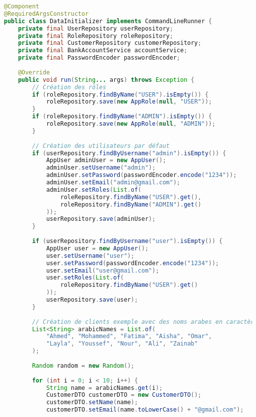 \documentclass[12pt,a4paper]{report}
\begin{document}
\begin{lstlisting}[language=Java, caption=DataInitializer.java]
@Component
@RequiredArgsConstructor
public class DataInitializer implements CommandLineRunner {
    private final UserRepository userRepository;
    private final RoleRepository roleRepository;
    private final CustomerRepository customerRepository;
    private final BankAccountService accountService;
    private final PasswordEncoder passwordEncoder;
    
    @Override
    public void run(String... args) throws Exception {
        // Création des rôles
        if (roleRepository.findByName("USER").isEmpty()) {
            roleRepository.save(new AppRole(null, "USER"));
        }
        if (roleRepository.findByName("ADMIN").isEmpty()) {
            roleRepository.save(new AppRole(null, "ADMIN"));
        }
        
        // Création des utilisateurs par défaut
        if (userRepository.findByUsername("admin").isEmpty()) {
            AppUser adminUser = new AppUser();
            adminUser.setUsername("admin");
            adminUser.setPassword(passwordEncoder.encode("1234"));
            adminUser.setEmail("admin@gmail.com");
            adminUser.setRoles(List.of(
                roleRepository.findByName("USER").get(),
                roleRepository.findByName("ADMIN").get()
            ));
            userRepository.save(adminUser);
        }
        
        if (userRepository.findByUsername("user").isEmpty()) {
            AppUser user = new AppUser();
            user.setUsername("user");
            user.setPassword(passwordEncoder.encode("1234"));
            user.setEmail("user@gmail.com");
            user.setRoles(List.of(
                roleRepository.findByName("USER").get()
            ));
            userRepository.save(user);
        }
        
        // Création de clients exemple avec des noms arabes en caractères latins
        List<String> arabicNames = List.of(
            "Ahmed", "Mohammed", "Fatima", "Aisha", "Omar",
            "Layla", "Youssef", "Nour", "Ali", "Zainab"
        );
        
        Random random = new Random();
        
        for (int i = 0; i < 10; i++) {
            String name = arabicNames.get(i);
            CustomerDTO customerDTO = new CustomerDTO();
            customerDTO.setName(name);
            customerDTO.setEmail(name.toLowerCase() + "@gmail.com");
            

\end{lstlisting}
\end{document}
